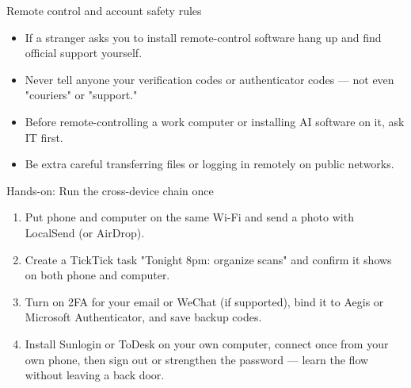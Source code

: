 \begin{tcbwarn}{Remote control and account safety rules}
\begin{itemize}
  \item If a stranger asks you to install remote-control software hang up and find official support yourself.
  \item Never tell anyone your verification codes or authenticator codes — not even "couriers" or "support."
  \item Before remote-controlling a work computer or installing AI software on it, ask IT first.
  \item Be extra careful transferring files or logging in remotely on public networks.
\end{itemize}

\end{tcbwarn}

\begin{tcbpractice}{Hands-on: Run the cross-device chain once}
\begin{enumerate}
  \item Put phone and computer on the same Wi-Fi and send a photo with LocalSend (or AirDrop).
  \item Create a TickTick task "Tonight 8pm: organize scans" and confirm it shows on both phone and computer.
  \item Turn on 2FA for your email or WeChat (if supported), bind it to Aegis or Microsoft Authenticator, and save backup codes.
  \item Install Sunlogin or ToDesk on your own computer, connect once from your own phone, then sign out or strengthen the password — learn the flow without leaving a back door.
\end{enumerate}

\end{tcbpractice}
